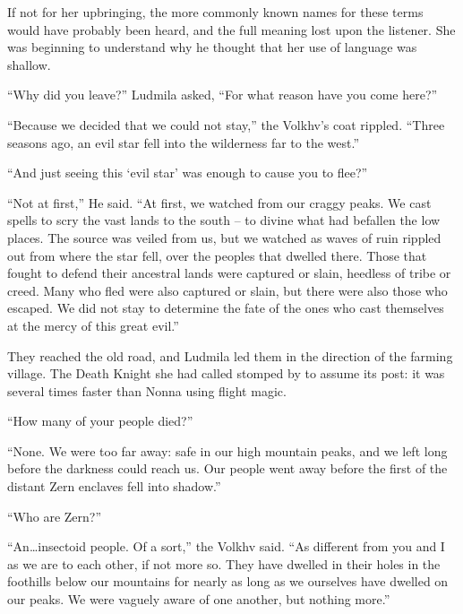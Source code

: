  

If not for her upbringing, the more commonly known names for these terms would have probably been heard, and the full meaning lost upon the listener. She was beginning to understand why he thought that her use of language was shallow.

 

“Why did you leave?” Ludmila asked, “For what reason have you come here?”

 

“Because we decided that we could not stay,” the Volkhv’s coat rippled. “Three seasons ago, an evil star fell into the wilderness far to the west.”

 

“And just seeing this ‘evil star’ was enough to cause you to flee?”

 

“Not at first,” He said. “At first, we watched from our craggy peaks. We cast spells to scry the vast lands to the south – to divine what had befallen the low places. The source was veiled from us, but we watched as waves of ruin rippled out from where the star fell, over the peoples that dwelled there. Those that fought to defend their ancestral lands were captured or slain, heedless of tribe or creed. Many who fled were also captured or slain, but there were also those who escaped. We did not stay to determine the fate of the ones who cast themselves at the mercy of this great evil.”

 

They reached the old road, and Ludmila led them in the direction of the farming village. The Death Knight she had called stomped by to assume its post: it was several times faster than Nonna using flight magic.

 

“How many of your people died?”

 

“None. We were too far away: safe in our high mountain peaks, and we left long before the darkness could reach us. Our people went away before the first of the distant Zern enclaves fell into shadow.”

 

“Who are Zern?”

 

“An…insectoid people. Of a sort,” the Volkhv said. “As different from you and I as we are to each other, if not more so. They have dwelled in their holes in the foothills below our mountains for nearly as long as we ourselves have dwelled on our peaks. We were vaguely aware of one another, but nothing more.”

